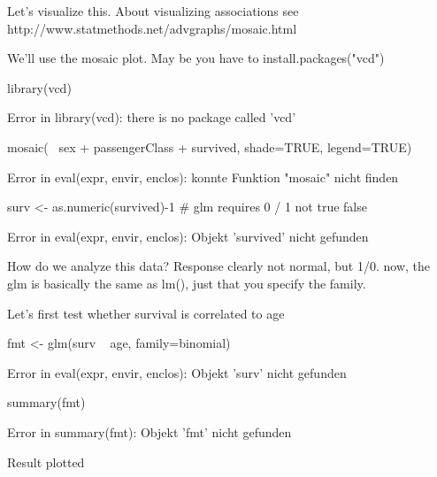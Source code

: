 \documentclass[a4paper,twoside]{tufte-book}\usepackage[]{graphicx}\usepackage[]{color}
\begin{document}
\begin{Anhang}
Let's visualize this. About visualizing associations see http://www.statmethods.net/advgraphs/mosaic.html

We'll use the mosaic plot. May be you have to install.packages("vcd")

\begin{Schunk}
\begin{Sinput}
library(vcd)
\end{Sinput}
\begin{Soutput}
Error in library(vcd): there is no package called 'vcd'
\end{Soutput}
\begin{Sinput}
mosaic(~ sex + passengerClass + survived, shade=TRUE, legend=TRUE) 
\end{Sinput}
\begin{Soutput}
Error in eval(expr, envir, enclos): konnte Funktion "mosaic" nicht finden
\end{Soutput}
\begin{Sinput}
surv <- as.numeric(survived)-1 # glm requires 0 / 1 not true false
\end{Sinput}
\begin{Soutput}
Error in eval(expr, envir, enclos): Objekt 'survived' nicht gefunden
\end{Soutput}
\end{Schunk}

How do we analyze this data? Response clearly not normal, but 1/0. now, the glm is basically the same as lm(), just that you specify the family.

Let's first test whether survival is correlated to age

\begin{Schunk}
\begin{Sinput}
fmt <- glm(surv ~ age, family=binomial)
\end{Sinput}
\begin{Soutput}
Error in eval(expr, envir, enclos): Objekt 'surv' nicht gefunden
\end{Soutput}
\begin{Sinput}
summary(fmt)
\end{Sinput}
\begin{Soutput}
Error in summary(fmt): Objekt 'fmt' nicht gefunden
\end{Soutput}
\end{Schunk}

Result plotted 


\end{Anhang}
\end{document}
